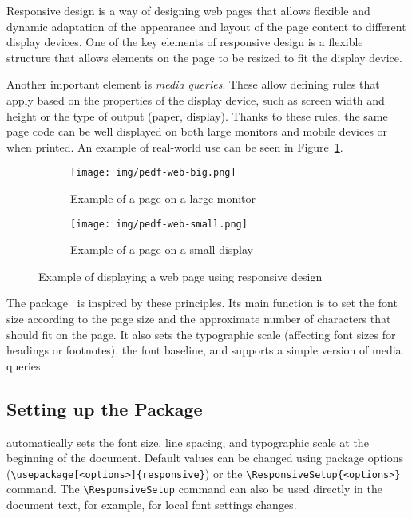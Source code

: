 \documentclass{ltugboat}
\begin{document}
Responsive design is a way of designing web pages that allows flexible and dynamic adaptation of the appearance and layout of the page content to different display devices. One of the key elements of responsive design is a flexible structure that allows elements on the page to be resized to fit the display device.

Another important element is \textit{media queries}. These allow defining rules that apply based on the properties of the display device, such as screen width and height or the type of output (paper, display). Thanks to these rules, the same page code can be well displayed on both large monitors and mobile devices or when printed. An example of real-world use can be seen in Figure~\ref{fig:responsive}.

\begin{figure}[tbp]
\begin{subfigure}[t]{0.74\textwidth}
    \texttt{[image: img/pedf-web-big.png]}
    \caption{Example of a page on a large monitor}
\end{subfigure}
\hfill
\begin{subfigure}[t]{0.24\textwidth}
    \texttt{[image: img/pedf-web-small.png]}
    \caption{Example of a page on a small display}
\end{subfigure}
  \caption{Example of displaying a web page using responsive design}\label{fig:responsive}
\end{figure}

The  package~\cite{responsive} is inspired by these principles. Its main function is to set the font size according to the page size and the approximate number of characters that should fit on the page. It also sets the typographic scale (affecting font sizes for headings or footnotes), the font baseline, and supports a simple version of media queries.

\subsection{Setting up the  Package}

 automatically sets the font size, line spacing, and typographic scale at the beginning of the document. Default values can be changed using package options (\verb|\usepackage[<options>]{responsive}|) or the \verb|\ResponsiveSetup{<options>}| command. The \verb|\ResponsiveSetup| command can also be used directly in the document text, for example, for local font settings changes.
\end{document}
